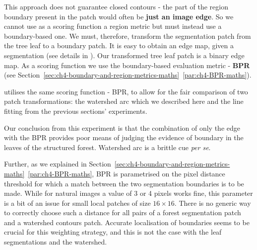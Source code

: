 This approach does not guarantee closed contours - the part of the region boundary present in the patch would often be {\bf just an image edge}. So we cannot use as a scoring function a region metric but must instead use a boundary-based one. We must, therefore, transform the segmentation patch from the tree leaf to a boundary patch. It is easy to obtain an edge map, given a segmentation (see details in ). Our transformed tree leaf patch is a binary edge map. As a scoring function we use the boundary-based evaluation metric - {\bf BPR} (see Section~\ref*{sec:ch4-boundary-and-region-metrics-maths}~\ref{par:ch4-BPR-maths}).

 utilises the same scoring function - BPR, to allow for the fair comparison of two patch transformations: the watershed arc which we described here and the line fitting from the previous sections' %
experiments. 

Our conclusion from this experiment is that the combination of only the edge with the BPR provides poor means of judging the evidence of boundary in the leaves of the structured forest. Watershed arc is a %
brittle cue {\it per se}. %

Further, as we explained in Section~\ref*{sec:ch4-boundary-and-region-metrics-maths}~\ref{par:ch4-BPR-maths}, BPR is parametrised on the pixel distance threshold for which a match between the two segmentation boundaries is to be made. While for natural images a value of 3 or 4 pixels works fine, this parameter is a bit of an issue for small local patches of size $16\times 16$. There is no generic way to correctly choose such a distance for all pairs of a forest segmentation patch and a watershed contours patch. Accurate localisation of boundaries seems to be crucial for this weighting strategy, and this is not the case with the leaf segmentations and the watershed.

